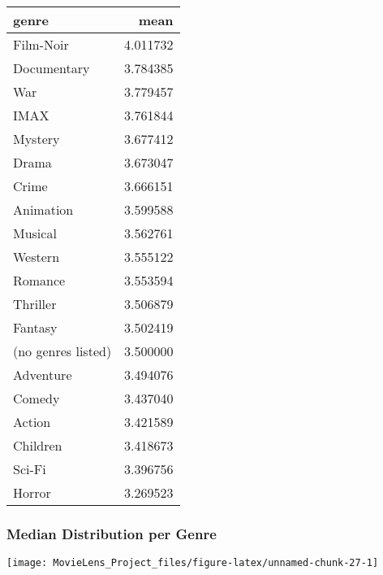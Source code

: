 \documentclass[]{article}
\begin{document}
\begin{table}[H]
\centering\begingroup\fontsize{10}{12}\selectfont

\begin{tabular}{l|r}
\hline
genre & mean\\
\hline
Film-Noir & 4.011732\\
\hline
Documentary & 3.784385\\
\hline
War & 3.779457\\
\hline
IMAX & 3.761844\\
\hline
Mystery & 3.677412\\
\hline
Drama & 3.673047\\
\hline
Crime & 3.666151\\
\hline
Animation & 3.599588\\
\hline
Musical & 3.562761\\
\hline
Western & 3.555122\\
\hline
Romance & 3.553594\\
\hline
Thriller & 3.506879\\
\hline
Fantasy & 3.502419\\
\hline
(no genres listed) & 3.500000\\
\hline
Adventure & 3.494076\\
\hline
Comedy & 3.437040\\
\hline
Action & 3.421589\\
\hline
Children & 3.418673\\
\hline
Sci-Fi & 3.396756\\
\hline
Horror & 3.269523\\
\hline
\end{tabular}
\endgroup{}
\end{table}

\hypertarget{median-distribution-per-genre}{%
\subsubsection{Median Distribution per
Genre}\label{median-distribution-per-genre}}

\begin{center}\texttt{[image: MovieLens\_Project\_files/figure-latex/unnamed-chunk-27-1]} \end{center}
\end{document}

